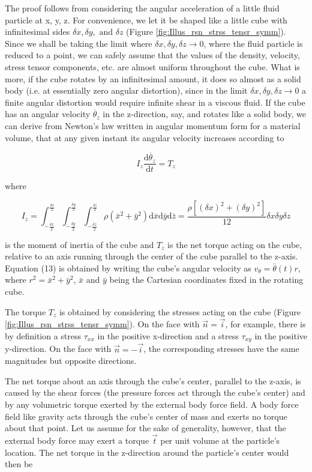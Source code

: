 \documentclass{article}
\begin{document}
{The proof follows from considering the angular acceleration of a little fluid particle at x, y, z. For convenience, we let it be shaped like a little cube with infinitesimal sides $\delta x, \delta y,\text{ and }\delta z$ (Figure \ref{fig:Illus_rsn_strss_tensr_symm}). Since we shall be taking the limit where $\delta x, \delta y,\delta z \to 0$, where the fluid particle is reduced to a point, we can safely assume that the values of the density, velocity, stress tensor components, etc. are almost uniform throughout the cube. What is more, if the cube rotates by an infinitesimal amount, it does so almost as a solid body (i.e. at essentially zero angular distortion), since in the limit $\delta x, \delta y,\delta z \to 0$ a finite angular distortion would require infinite shear in a viscous fluid. If the cube has an angular velocity $\dot{\theta_{z}}$ in the z-direction, say, and rotates like a solid body, we can derive from Newton's law written in angular momentum form for a material volume, that at any given instant its angular velocity increases according to 

$$I_{z}\frac{\text{d}\dot{\theta_{z}}}{\text{d}t} = T_{z}$$

where

$$I_{z} = \int_{-\frac{\delta x}{2}}^{\frac{\delta x}{2}}\int_{-\frac{\delta y}{2}}^{\frac{\delta y}{2}}\int_{-\frac{\delta z}{2}}^{\frac{\delta z}{2}}\rho(\bar{x}^{2}+\bar{y}^{2})\text{d}\bar{x}\text{d}\bar{y}\text{d}\bar{z} = \frac{\rho[(\delta x)^2 + (\delta y)^2]}{12}\delta x\delta y \delta z$$

is the moment of inertia of the cube and $T_z$ is the net torque acting on the cube, relative to
an axis running through the center of the cube parallel to the z-axis. Equation (13) is obtained by writing the cube’s angular velocity as $v_{\theta} = \bar{\theta}(t)r$, where $r^2 = \bar{x}^2 + \bar{y}^2$, $\bar{x}$ and $\bar{y}$ being the Cartesian coordinates fixed in the rotating cube.

The torque $T_{z}$ is obtained by considering the stresses acting on the cube (Figure \ref{fig:Illus_rsn_strss_tensr_symm}). On the face with $\overrightarrow{n} = \overrightarrow{i}$, for example, there is by definition a stress $\tau_{xx}$ in the positive x-direction and a stress $\tau_{xy}$ in the positive y-direction. On the face with $\overrightarrow{n} = -\overrightarrow{i}$, the corresponding stresses have the same magnitudes but opposite directions.


The net torque about an axis through the cube's center, parallel to the z-axis, is caused by
the shear forces (the pressure forces act through the cube’s center) and by any volumetric
torque exerted by the external body force field. A body force field like gravity acts through
the cube's center of mass and exerts no torque about that point. Let us assume for the sake
of generality, however, that the external body force may exert a torque $\overrightarrow{t}$ per unit volume at the particle's location. The net torque in the z-direction around the particle's center would then be

}
\end{document}
